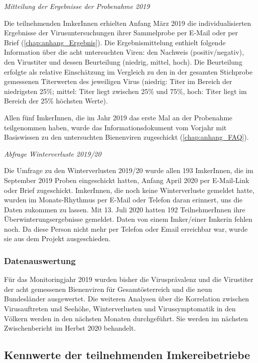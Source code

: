 \textit{Mitteilung der Ergebnisse der Probenahme 2019}

Die teilnehmenden ImkerInnen erhielten Anfang März 2019 die individualisierten Ergebnisse der Virusuntersuchungen ihrer Sammelprobe per E-Mail oder per Brief (\cref{chap:anhang_Ergebnis}). Die Ergebnismittelung enthielt folgende Information über die acht untersuchten Viren: den Nachweis (positiv/negativ), den Virustiter und dessen Beurteilung (niedrig, mittel, hoch). Die Beurteilung erfolgte als relative Einschätzung im Vergleich zu den in der gesamten Stichprobe gemessenen Titerwerten des jeweiligen Virus (niedrig: Titer im Bereich der niedrigsten 25\%; mittel: Titer liegt zwischen 25\% und 75\%, hoch: Titer liegt im Bereich der 25\% höchsten Werte).

Allen fünf ImkerInnen, die im Jahr 2019 das erste Mal an der Probenahme teilgenommen haben, wurde das Informationsdokument vom Vorjahr mit Basiswissen zu den untersuchten Bienenviren  zugeschickt (\cref{chap:anhang_FAQ}).


\textit{Abfrage Winterverluste 2019/20}

Die Umfrage zu den Winterverlusten 2019/20 wurde allen 193 ImkerInnen, die im September 2019 Proben eingeschickt hatten, Anfang April 2020 per E-Mail-Link oder Brief zugeschickt. ImkerInnen, die noch keine Winterverluste gemeldet hatte, wurden im Monats-Rhythmus per E-Mail oder Telefon daran erinnert, uns die Daten zukommen zu lassen. Mit 13. Juli 2020 hatten 192 TeilnehmerInnen ihre Überwinterungsergebnisse gemeldet. Daten von einem Imker/einer Imkerin fehlen noch. Da diese Person nicht mehr per Telefon oder Email erreichbar war, wurde sie aus dem Projekt ausgeschieden.

\subsubsection{Datenauswertung}

Für das Monitoringjahr 2019 wurden bisher die Virusprävalenz und die Virustiter der acht gemessenen Bienenviren für Gesamtösterreich und die neun Bundesländer ausgewertet. Die weiteren Analysen über die Korrelation zwischen Virusauftreten und Seehöhe, Winterverlusten und Virussymptomatik in den Völkern werden in den nächsten Monaten durchgeführt. Sie werden im nächsten Zwischenbericht im Herbst 2020 behandelt. 

\subsection{Kennwerte der teilnehmenden Imkereibetriebe}

